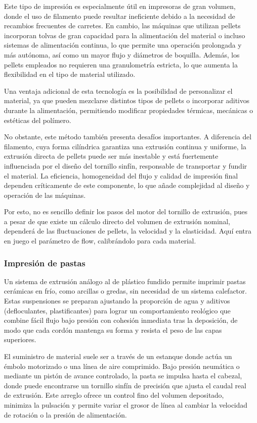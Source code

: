 Este tipo de impresión es especialmente útil en impresoras de gran volumen, donde el uso de filamento puede resultar ineficiente debido a la necesidad de recambios frecuentes de carretes. En cambio, las máquinas que utilizan pellets incorporan tolvas de gran capacidad para la alimentación del material o incluso sistemas de alimentación continua, lo que permite una operación prolongada y más autónoma, así como un mayor flujo y diámetros de boquilla. Además, los pellets empleados no requieren una granulometría estricta, lo que aumenta la flexibilidad en el tipo de material utilizado.

Una ventaja adicional de esta tecnología es la posibilidad de personalizar el material, ya que pueden mezclarse distintos tipos de pellets o incorporar aditivos durante la alimentación, permitiendo modificar propiedades térmicas, mecánicas o estéticas del polímero.  

No obstante, este método también presenta desafíos importantes. A diferencia del filamento, cuya forma cilíndrica garantiza una extrusión continua y uniforme, la extrusión directa de pellets puede ser más inestable y está fuertemente influenciada por el diseño del tornillo sinfín, responsable de transportar y fundir el material. La eficiencia, homogeneidad del flujo y calidad de impresión final dependen críticamente de este componente, lo que añade complejidad al diseño y operación de las máquinas.

Por esto, no es sencillo definir los pasos del motor del tornillo de extrusión, pues a pesar de que existe un cálculo directo del volumen de extrusión nominal, dependerá de las fluctuaciones de pellets, la velocidad y la elasticidad. Aquí entra en juego el parámetro de flow, calibrándolo para cada material.

\subsubsection{Impresión de pastas}

Un sistema de extrusión análogo al de plástico fundido permite imprimir pastas cerámicas en frío, como arcillas o gredas, sin necesidad de un sistema calefactor. Estas suspensiones se preparan ajustando la proporción de agua y aditivos (defloculantes, plastificantes) para lograr un comportamiento reológico que combine fácil flujo bajo presión con cohesión inmediata tras la deposición, de modo que cada cordón mantenga su forma y resista el peso de las capas superiores.

El suministro de material suele ser a través de un estanque donde actúa un émbolo motorizado o una línea de aire comprimido. Bajo presión neumática o mediante un pistón de avance controlado, la pasta se impulsa hasta el cabezal, donde puede encontrarse un tornillo sinfín de precisión que ajusta el caudal real de extrusión. Este arreglo ofrece un control fino del volumen depositado, minimiza la pulsación y permite variar el grosor de línea al cambiar la velocidad de rotación o la presión de alimentación.

